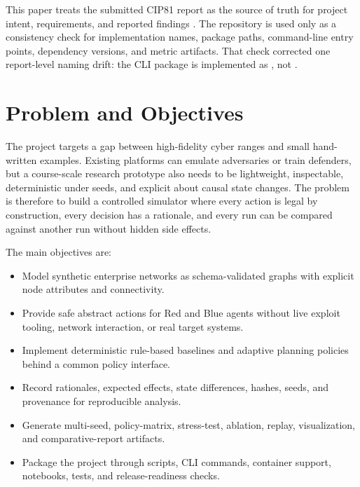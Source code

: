\documentclass[10pt,twocolumn]{article}
\begin{document}
This paper treats the submitted CIP81 report as the source of truth for project intent, requirements, and reported findings \cite{cip81}. The repository is used only as a consistency check for implementation names, package paths, command-line entry points, dependency versions, and metric artifacts. That check corrected one report-level naming drift: the CLI package is implemented as , not .

\section{Problem and Objectives}
The project targets a gap between high-fidelity cyber ranges and small hand-written examples. Existing platforms can emulate adversaries or train defenders, but a course-scale research prototype also needs to be lightweight, inspectable, deterministic under seeds, and explicit about causal state changes. The problem is therefore to build a controlled simulator where every action is legal by construction, every decision has a rationale, and every run can be compared against another run without hidden side effects.

The main objectives are:
\begin{itemize}
\item Model synthetic enterprise networks as schema-validated graphs with explicit node attributes and connectivity.
\item Provide safe abstract actions for Red and Blue agents without live exploit tooling, network interaction, or real target systems.
\item Implement deterministic rule-based baselines and adaptive planning policies behind a common policy interface.
\item Record rationales, expected effects, state differences, hashes, seeds, and provenance for reproducible analysis.
\item Generate multi-seed, policy-matrix, stress-test, ablation, replay, visualization, and comparative-report artifacts.
\item Package the project through scripts, CLI commands, container support, notebooks, tests, and release-readiness checks.
\end{itemize}
\end{document}
